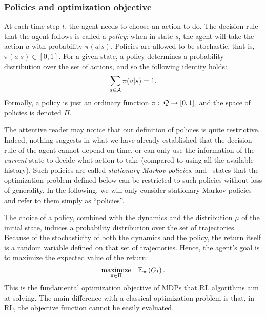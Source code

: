 		\subsubsection{Policies and optimization objective} 
			At each time step $t$, the agent needs to choose an action to do. The decision rule that the agent follows is called a\emph{ policy}: when in state $s$, the agent will take the action $a$ with probability $\pi(a|s)$. Policies are allowed to be stochastic, that is, $\pi(a|s) \in [0, 1]$. For a given state, a policy determines a probability distribution over the set of actions, and so the following identity holds:
			\begin{equation*}
			\sum_{a\in\mathcal{A}}\pi(a|s) = 1.
			\end{equation*} 
			Formally, a policy is just an ordinary function $\pi:\,\mathcal{Q}\to[0,1]$, and the space of policies is denoted $\Pi$.\par
			The attentive reader may notice that our definition of policies is quite restrictive. Indeed, nothing suggests in what we have already established that the decision rule of the agent cannot depend on time, or can only use the information of the\emph{ current} state to decide what action to take (compared to using all the available history). Such policies are called\emph{ stationary Markov policies}, and~\cite[Theorem\,2.1]{altman1999constrained} states that the optimization problem defined below can be restricted to such policies without loss of generality. In the following, we will only consider stationary Markov policies and refer to them simply as \enquote{policies}.\par
			The choice of a policy, combined with the dynamics and the distribution $\mu$ of the initial state, induces a probability distribution over the set of trajectories. Because of the stochasticity of both the dynamics and the policy, the return itself is a random variable defined on that set of trajectories. Hence, the agent's goal is to maximize the expected value of the return:
			\begin{equation}
					\underset{\pi\in\Pi}{\text{maximize}}\quad\mathbb{E}_\pi\left(G_t\right). \label{eq:mdp problem}
			\end{equation}
			This is the fundamental optimization objective of MDPs that RL algorithms aim at solving. The main difference with a classical optimization problem is that, in RL, the objective function cannot be easily evaluated.
